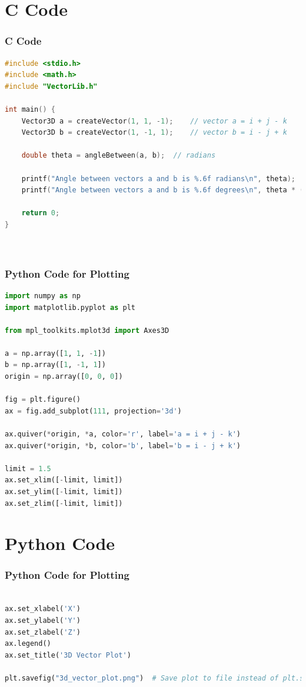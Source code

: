 \documentclass{beamer}
\theoremstyle{remark}
\numberwithin{equation}{section}
\begin{document}
\section{ C Code}
\begin{frame}[fragile]
\frametitle{C Code }
\begin{lstlisting}[language=C]
#include <stdio.h>
#include <math.h>
#include "VectorLib.h"

int main() {
    Vector3D a = createVector(1, 1, -1);    // vector a = i + j - k
    Vector3D b = createVector(1, -1, 1);    // vector b = i - j + k

    double theta = angleBetween(a, b);  // radians

    printf("Angle between vectors a and b is %.6f radians\n", theta);
    printf("Angle between vectors a and b is %.6f degrees\n", theta * (180.0 / M_PI));

    return 0;
}

    
\end{lstlisting}
\end{frame}

\begin{frame}[fragile]
\frametitle{Python Code for Plotting}
\begin{lstlisting}[language=Python]
import numpy as np
import matplotlib.pyplot as plt

from mpl_toolkits.mplot3d import Axes3D

a = np.array([1, 1, -1])
b = np.array([1, -1, 1])
origin = np.array([0, 0, 0])

fig = plt.figure()
ax = fig.add_subplot(111, projection='3d')

ax.quiver(*origin, *a, color='r', label='a = i + j - k')
ax.quiver(*origin, *b, color='b', label='b = i - j + k')

limit = 1.5
ax.set_xlim([-limit, limit])
ax.set_ylim([-limit, limit])
ax.set_zlim([-limit, limit])

\end{lstlisting}

\end{frame}
\section{Python Code}
\begin{frame}[fragile]
\frametitle{Python Code for Plotting}
\begin{lstlisting}[language=Python]   

ax.set_xlabel('X')
ax.set_ylabel('Y')
ax.set_zlabel('Z')
ax.legend()
ax.set_title('3D Vector Plot')

plt.savefig("3d_vector_plot.png")  # Save plot to file instead of plt.show()

\end{lstlisting}

\end{frame}
\end{document}

